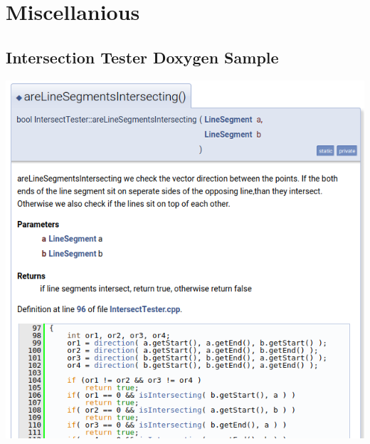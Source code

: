 \chapter{Miscellanious}
\section{Intersection Tester Doxygen Sample} \label{app:Pointless}
\includegraphics[width=1\textwidth]{images/softwareDevelopment}


